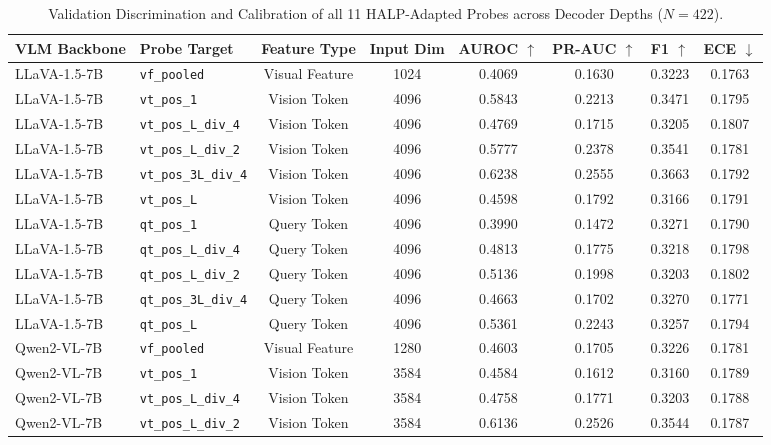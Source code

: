 \begin{table}[t]
\centering
\small
\caption{Validation Discrimination and Calibration of all 11 HALP-Adapted Probes across Decoder Depths ($N=422$).}
\label{tab:halp_11probes}
\begin{tabular}{llcccccc}
\toprule
\textbf{VLM Backbone} & \textbf{Probe Target} & \textbf{Feature Type} & \textbf{Input Dim} & \textbf{AUROC} $\uparrow$ & \textbf{PR-AUC} $\uparrow$ & \textbf{F1} $\uparrow$ & \textbf{ECE} $\downarrow$ \\
\midrule
LLaVA-1.5-7B & \texttt{vf_pooled} & Visual Feature & 1024 & 0.4069 & 0.1630 & 0.3223 & 0.1763 \\
LLaVA-1.5-7B & \texttt{vt_pos_1} & Vision Token & 4096 & 0.5843 & 0.2213 & 0.3471 & 0.1795 \\
LLaVA-1.5-7B & \texttt{vt_pos_L_div_4} & Vision Token & 4096 & 0.4769 & 0.1715 & 0.3205 & 0.1807 \\
LLaVA-1.5-7B & \texttt{vt_pos_L_div_2} & Vision Token & 4096 & 0.5777 & 0.2378 & 0.3541 & 0.1781 \\
LLaVA-1.5-7B & \texttt{vt_pos_3L_div_4} & Vision Token & 4096 & 0.6238 & 0.2555 & 0.3663 & 0.1792 \\
LLaVA-1.5-7B & \texttt{vt_pos_L} & Vision Token & 4096 & 0.4598 & 0.1792 & 0.3166 & 0.1791 \\
LLaVA-1.5-7B & \texttt{qt_pos_1} & Query Token & 4096 & 0.3990 & 0.1472 & 0.3271 & 0.1790 \\
LLaVA-1.5-7B & \texttt{qt_pos_L_div_4} & Query Token & 4096 & 0.4813 & 0.1775 & 0.3218 & 0.1798 \\
LLaVA-1.5-7B & \texttt{qt_pos_L_div_2} & Query Token & 4096 & 0.5136 & 0.1998 & 0.3203 & 0.1802 \\
LLaVA-1.5-7B & \texttt{qt_pos_3L_div_4} & Query Token & 4096 & 0.4663 & 0.1702 & 0.3270 & 0.1771 \\
LLaVA-1.5-7B & \texttt{qt_pos_L} & Query Token & 4096 & 0.5361 & 0.2243 & 0.3257 & 0.1794 \\
\midrule
Qwen2-VL-7B & \texttt{vf_pooled} & Visual Feature & 1280 & 0.4603 & 0.1705 & 0.3226 & 0.1781 \\
Qwen2-VL-7B & \texttt{vt_pos_1} & Vision Token & 3584 & 0.4584 & 0.1612 & 0.3160 & 0.1789 \\
Qwen2-VL-7B & \texttt{vt_pos_L_div_4} & Vision Token & 3584 & 0.4758 & 0.1771 & 0.3203 & 0.1788 \\
Qwen2-VL-7B & \texttt{vt_pos_L_div_2} & Vision Token & 3584 & 0.6136 & 0.2526 & 0.3544 & 0.1787 \\

\end{tabular}
\end{table}

